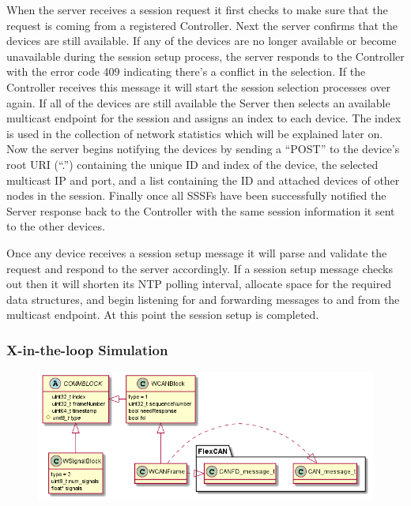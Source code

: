 \documentclass[letterpaper,twocolumn,12pt]{article}
\begin{document}
When the server receives a session request it first checks to make sure that the request is coming from a registered Controller. Next the server confirms that the devices are still available. If any of the devices are no longer available or become unavailable during the session setup process, the server responds to the Controller with the error code 409 indicating there's a conflict in the selection. If the Controller receives this message it will start the session selection processes over again. If all of the devices are still available the Server then selects an available multicast endpoint for the session and assigns an index to each device. The index is used in the collection of network statistics which will be explained later on. Now the server begins notifying the devices by sending a “POST” to the device’s root URI (“.”) containing the unique ID and index of the device, the selected multicast IP and port, and a list containing the ID and attached devices of other nodes in the session. Finally once all SSSFs have been successfully notified the Server response back to the Controller with the same session information it sent to the other devices.

Once any device receives a session setup message it will parse and validate the request and respond to the server accordingly. If a session setup message checks out then it will shorten its NTP polling interval, allocate space for the required data structures, and begin listening for and forwarding messages to and from the multicast endpoint. At this point the session setup is completed.

\subsubsection{X-in-the-loop Simulation}
\begin{figure}[t!]
    \centering
    \includegraphics[width=\linewidth]{out/images/data_structures/data_structures.png}
    
    \caption{}
    \label{fig:}
\end{figure}
\end{document}
